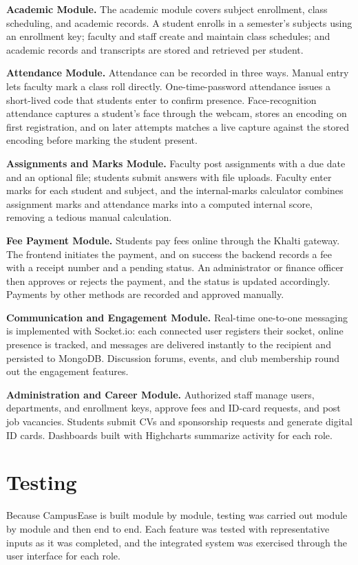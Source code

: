 \documentclass[12pt,a4paper]{report}
\begin{document}
\textbf{Academic Module.}
The academic module covers subject enrollment, class scheduling, and academic records. A student enrolls in a semester's subjects using an enrollment key; faculty and staff create and maintain class schedules; and academic records and transcripts are stored and retrieved per student.

\textbf{Attendance Module.}
Attendance can be recorded in three ways. Manual entry lets faculty mark a class roll directly. One-time-password attendance issues a short-lived code that students enter to confirm presence. Face-recognition attendance captures a student's face through the webcam, stores an encoding on first registration, and on later attempts matches a live capture against the stored encoding before marking the student present.

\textbf{Assignments and Marks Module.}
Faculty post assignments with a due date and an optional file; students submit answers with file uploads. Faculty enter marks for each student and subject, and the internal-marks calculator combines assignment marks and attendance marks into a computed internal score, removing a tedious manual calculation.

\textbf{Fee Payment Module.}
Students pay fees online through the Khalti gateway. The frontend initiates the payment, and on success the backend records a fee with a receipt number and a pending status. An administrator or finance officer then approves or rejects the payment, and the status is updated accordingly. Payments by other methods are recorded and approved manually.

\textbf{Communication and Engagement Module.}
Real-time one-to-one messaging is implemented with Socket.io: each connected user registers their socket, online presence is tracked, and messages are delivered instantly to the recipient and persisted to MongoDB. Discussion forums, events, and club membership round out the engagement features.

\textbf{Administration and Career Module.}
Authorized staff manage users, departments, and enrollment keys, approve fees and ID-card requests, and post job vacancies. Students submit CVs and sponsorship requests and generate digital ID cards. Dashboards built with Highcharts summarize activity for each role.

\section{Testing}

Because CampusEase is built module by module, testing was carried out module by module and then end to end. Each feature was tested with representative inputs as it was completed, and the integrated system was exercised through the user interface for each role.
\end{document}
